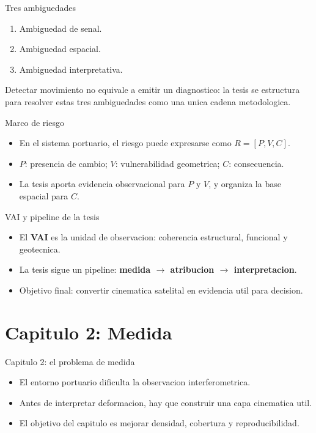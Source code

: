 \documentclass[aspectratio=169]{beamer}
\begin{document}
\begin{frame}{Tres ambiguedades}
  \begin{enumerate}
    \item Ambiguedad de senal.
    \item Ambiguedad espacial.
    \item Ambiguedad interpretativa.
  \end{enumerate}
  \vspace{0.4cm}
  Detectar movimiento no equivale a emitir un diagnostico: la tesis se estructura para resolver estas tres ambiguedades como una unica cadena metodologica.
\end{frame}

\begin{frame}{Marco de riesgo}
  \begin{itemize}
    \item En el sistema portuario, el riesgo puede expresarse como $R = [P, V, C]$.
    \item $P$: presencia de cambio; $V$: vulnerabilidad geometrica; $C$: consecuencia.
    \item La tesis aporta evidencia observacional para $P$ y $V$, y organiza la base espacial para $C$.
  \end{itemize}
\end{frame}

\begin{frame}{VAI y pipeline de la tesis}
  \begin{itemize}
    \item El \textbf{VAI} es la unidad de observacion: coherencia estructural, funcional y geotecnica.
    \item La tesis sigue un pipeline: \textbf{medida $\rightarrow$ atribucion $\rightarrow$ interpretacion}.
    \item Objetivo final: convertir cinematica satelital en evidencia util para decision.
  \end{itemize}
\end{frame}

\section{Capitulo 2: Medida}

\begin{frame}{Capitulo 2: el problema de medida}
  \begin{itemize}
    \item El entorno portuario dificulta la observacion interferometrica.
    \item Antes de interpretar deformacion, hay que construir una capa cinematica util.
    \item El objetivo del capitulo es mejorar densidad, cobertura y reproducibilidad.
  \end{itemize}
\end{frame}
\end{document}
